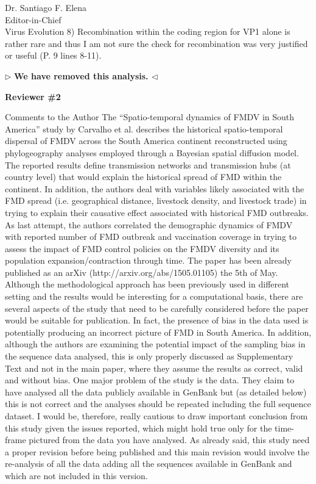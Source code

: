 \documentclass[ucla,biomath,12pt,noaddrfooter,datefrom]{UC_letter}
\newenvironment{reply}{$\triangleright$\bf}{$\triangleleft$}
\begin{document}
\begin{letter}{
Dr. Santiago F. Elena \\
Editor-in-Chief \\
Virus Evolution
}
8)      Recombination within the coding region for VP1 alone is rather rare and thus I am not sure the check for recombination was very justified or useful (P. 9 lines 8-11).

\begin{reply}
We have removed this analysis.
\end{reply}


\textbf{Reviewer \#2}

Comments to the Author
The ``Spatio-temporal dynamics of FMDV in South America'' study by Carvalho et al. describes the historical spatio-temporal dispersal of FMDV across the South America continent reconstructed using phylogeography analyses employed through a Bayesian spatial diffusion model. 
The reported results define transmission networks and transmission hubs (at country level) that would explain the historical spread of FMD within the continent. 
In addition, the authors deal with variables likely associated with the FMD spread (i.e. geographical distance, livestock density, and livestock trade) in trying to explain their causative effect associated with historical FMD outbreaks. 
As last attempt, the authors correlated the demographic dynamics of FMDV with reported number of FMD outbreak and vaccination coverage in trying to assess the impact of FMD control policies on the FMDV diversity and its population expansion/contraction through time. 
The paper has been already published as an arXiv (http://arxiv.org/abs/1505.01105) the 5th of May. 
Although the methodological approach has been previously used in different setting and the results would be interesting for a computational basis, there are several aspects of the study that need to be carefully considered before the paper would be suitable for publication. 
In fact, the presence of bias in the data used is potentially producing an incorrect picture of FMD in South America. 
In addition, although the authors are examining the potential impact of the sampling bias in the sequence data analysed, this is only properly discussed as Supplementary Text and not in the main paper, where they assume the results as correct, valid and without bias. 
One major problem of the study is the data. 
They claim to have analysed all the data publicly available in GenBank but (as detailed below) this is not correct and the analyses should be repeated including the full sequence dataset. 
I would be, therefore, really cautious to draw important conclusion from this study given the issues reported, which might hold true only for the time-frame pictured from the data you have analysed. 
As already said, this study need a proper revision before being published and this main revision would involve the re-analysis of all the data adding all the sequences available in GenBank and which are not included in this version.


\end{letter}
\end{document}
